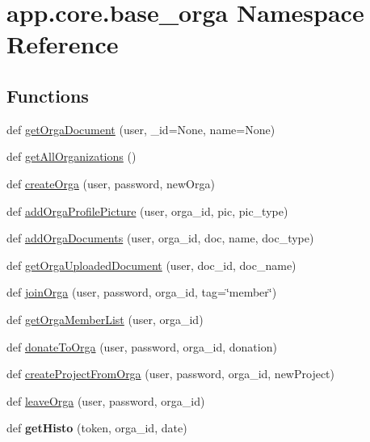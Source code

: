 \hypertarget{namespaceapp_1_1core_1_1base__orga}{}\section{app.\+core.\+base\+\_\+orga Namespace Reference}
\label{namespaceapp_1_1core_1_1base__orga}
\subsection*{Functions}
\begin{DoxyCompactItemize}
\item 
def \hyperlink{namespaceapp_1_1core_1_1base__orga_aed2475cedbcb473df07a6a37ff8193f3}{get\+Orga\+Document} (user, \+\_\+id=None, name=None)
\item 
def \hyperlink{namespaceapp_1_1core_1_1base__orga_ad1d50f9c6e937bf46e72dfa1f6673eaa}{get\+All\+Organizations} ()
\item 
def \hyperlink{namespaceapp_1_1core_1_1base__orga_acd280d85676753be745926d2671511b3}{create\+Orga} (user, password, new\+Orga)
\item 
def \hyperlink{namespaceapp_1_1core_1_1base__orga_a389521656081e40b458b98e094339a1a}{add\+Orga\+Profile\+Picture} (user, orga\+\_\+id, pic, pic\+\_\+type)
\item 
def \hyperlink{namespaceapp_1_1core_1_1base__orga_aa6e75965aff943ba9256f81c4d18e7bf}{add\+Orga\+Documents} (user, orga\+\_\+id, doc, name, doc\+\_\+type)
\item 
def \hyperlink{namespaceapp_1_1core_1_1base__orga_af8f9957c34970929893659a4b5bdb366}{get\+Orga\+Uploaded\+Document} (user, doc\+\_\+id, doc\+\_\+name)
\item 
def \hyperlink{namespaceapp_1_1core_1_1base__orga_a3e303f8a7ab093778a9a731691641cf9}{join\+Orga} (user, password, orga\+\_\+id, tag=\char`\"{}member\char`\"{})
\item 
def \hyperlink{namespaceapp_1_1core_1_1base__orga_a164bcc0870cbdc1a3648579c1a69180b}{get\+Orga\+Member\+List} (user, orga\+\_\+id)
\item 
def \hyperlink{namespaceapp_1_1core_1_1base__orga_a0b363c7014b086738ef903e369e87afa}{donate\+To\+Orga} (user, password, orga\+\_\+id, donation)
\item 
def \hyperlink{namespaceapp_1_1core_1_1base__orga_a57934420089a447f535554b1067fa853}{create\+Project\+From\+Orga} (user, password, orga\+\_\+id, new\+Project)
\item 
def \hyperlink{namespaceapp_1_1core_1_1base__orga_aaa386431ed6a09fef2fc05fdc56070a3}{leave\+Orga} (user, password, orga\+\_\+id)
\item 
\mbox{\label{namespaceapp_1_1core_1_1base__orga_ac0e50a38f97fc18be33d64679f026373}} 
def {\bfseries get\+Histo} (token, orga\+\_\+id, date)
\end{DoxyCompactItemize}


